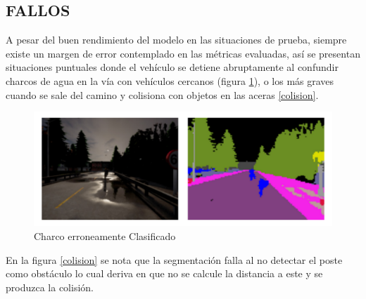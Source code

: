
\subsection{FALLOS}
A pesar del buen rendimiento del modelo en las situaciones de prueba, siempre existe un margen de error contemplado en las métricas evaluadas, así se presentan situaciones puntuales donde el vehículo se detiene abruptamente al confundir charcos de agua en la vía con vehículos cercanos (figura \ref{charco}), o los más graves cuando se sale del camino y colisiona con objetos en las aceras \ref{colision}.

\begin{figure}[H]
	\centering
	\includegraphics[scale=0.7]{imagenes/preds/err1}
	\caption[Charco erroneamente Clasificado]{Charco erroneamente Clasificado}
	\label{charco}
\end{figure}


En la figura \ref{colision} se nota que la segmentación falla al no detectar el poste como obstáculo lo cual deriva en que no se calcule la distancia a este y se produzca la colisión.

